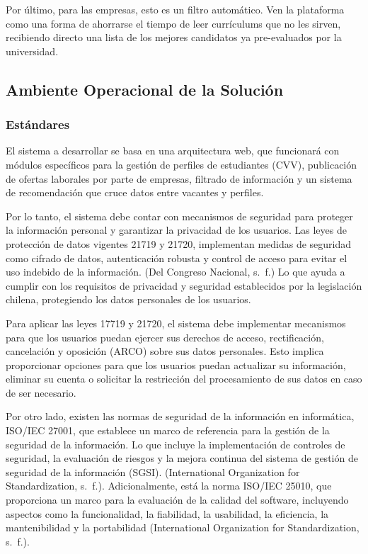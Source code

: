 \documentclass[11pt,a4paper]{Plantilla}
\begin{document}
Por último, para las empresas, esto es un filtro automático. Ven la plataforma como una forma de ahorrarse el tiempo de leer currículums que no les sirven, recibiendo directo una lista de los mejores candidatos ya pre-evaluados por la universidad.


\subsection{Ambiente Operacional de la Solución}%
\subsubsection*{Estándares}
El sistema a desarrollar se basa en una arquitectura web, que funcionará con módulos específicos para la gestión de perfiles de estudiantes (CVV), publicación de ofertas laborales por parte de empresas, filtrado de información y un sistema de recomendación que cruce datos entre vacantes y perfiles.

\vspace{5pt}

Por lo tanto, el sistema debe contar con mecanismos de seguridad para proteger la información personal y garantizar la privacidad de los usuarios. Las leyes de protección de datos vigentes 21719 y 21720, implementan medidas de seguridad como cifrado de datos, autenticación robusta y control de acceso para evitar el uso indebido de la información. (Del Congreso Nacional, s. f.) Lo que ayuda a cumplir con los requisitos de privacidad y seguridad establecidos por la legislación chilena, protegiendo los datos personales de los usuarios.

\vspace{5pt}

Para aplicar las leyes 17719 y 21720, el sistema debe implementar mecanismos para que los usuarios puedan ejercer sus derechos de acceso, rectificación, cancelación y oposición (ARCO) sobre sus datos personales. Esto implica proporcionar opciones para que los usuarios puedan actualizar su información, eliminar su cuenta o solicitar la restricción del procesamiento de sus datos en caso de ser necesario. 

\vspace{5pt}

Por otro lado, existen las normas de seguridad de la información en informática, ISO/IEC 27001, que establece un marco de referencia para la gestión de la seguridad de la información. Lo que incluye la implementación de controles de seguridad, la evaluación de riesgos y la mejora continua del sistema de gestión de seguridad de la información (SGSI). (International Organization for Standardization, s. f.). Adicionalmente, está la norma ISO/IEC 25010, que proporciona un marco para la evaluación de la calidad del software, incluyendo aspectos como la funcionalidad, la fiabilidad, la usabilidad, la eficiencia, la mantenibilidad y la portabilidad (International Organization for Standardization, s. f.).
\end{document}
